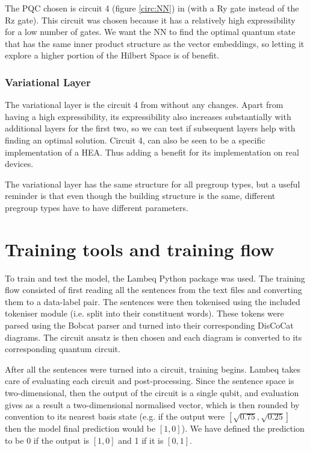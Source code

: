 The PQC chosen is circuit 4 (figure \ref{circ:NN}) in \cite{sim_expressibility_2019} (with a Ry gate instead of the Rz gate). This circuit was chosen because it has a relatively high expressibility for a low number of gates. We want the NN to find the optimal quantum state that has the same inner product structure as the vector embeddings, so letting it explore a higher portion of the Hilbert Space is of benefit.



\subsubsection{Variational Layer}

The variational layer is the circuit 4 from \cite{sim_expressibility_2019} without any changes. Apart from having a high expressibility, its expressibility also increases substantially with additional layers for the first two, so we can test if subsequent layers help with finding an optimal solution. Circuit 4, can also be seen to be a specific implementation of a HEA. Thus adding a benefit for its implementation on real devices.

The variational layer has the same structure for all pregroup types, but a useful reminder is that even though the building structure is the same, different pregroup types have to have different parameters. 


\section{Training tools and training flow}

To train and test the model, the Lambeq Python package was used. The training flow consisted of first reading all the sentences from the text files and converting them to a data-label pair. The sentences were then tokenised using the included tokeniser module (i.e. split into their constituent words). These tokens were parsed using the Bobcat parser and turned into their corresponding DisCoCat diagrams. The circuit ansatz is then chosen and each diagram is converted to its corresponding quantum circuit.

After all the sentences were turned into a circuit, training begins. Lambeq takes care of evaluating each circuit and post-processing. Since the sentence space is two-dimensional, then the output of the circuit is a single qubit, and evaluation gives as a result a two-dimensional normalised vector, which is then rounded by convention to its nearest basis state (e.g. if the output were $[\sqrt{0.75},\sqrt{0.25}]$ then the model final prediction would be $[1,0]$). We have defined the prediction to be 0 if the output is $[1,0]$ and 1 if it is $[0,1]$. 

